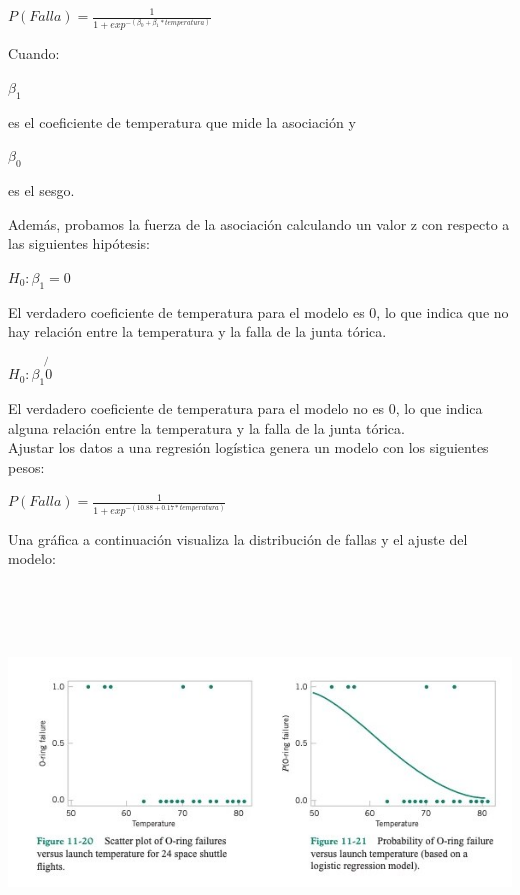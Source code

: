 \begin{center}  
$P(Falla)= \frac{1}{1+exp^{-(\beta_0+\beta_1*temperatura)}}$
\end{center}

Cuando:

\begin{center}  
$\beta_1$
\end{center}

es el coeficiente de temperatura que mide la asociación y


\begin{center}  
$\beta_0$
\end{center}


es el sesgo.

Además, probamos la fuerza de la asociación calculando un valor z con respecto a
las siguientes hipótesis:



\begin{center}  
$H_0 : \beta_1 = 0$
\end{center}


El verdadero coeficiente de temperatura para el modelo es 0, lo que indica que
no hay relación entre la temperatura y la falla de la junta tórica.


\begin{center}  
$H_0 : \beta_1 \not {0}$
\end{center}

El verdadero coeficiente de temperatura para el modelo no es 0, lo que indica
alguna relación entre la temperatura y la falla de la junta tórica.\\

Ajustar los datos a una regresión logística genera un modelo con los siguientes
pesos:

\begin{center}  
$P(Falla)= \frac{1}{1+exp^{-(10.88+0.17*temperatura)}}$
\end{center}


Una gráfica a continuación visualiza la distribución de fallas y el ajuste del modelo:


\includegraphics[width=15cm, height=10cm]{figures/challenger_plots.jpg}

